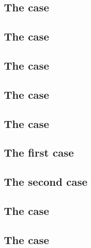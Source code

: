 \subsection{The  case} \label{bls: pointevaluation}    
\subsection{The  case}             \label{bls: g1add}               
\subsection{The  case}             \label{bls: g1msm}               
\subsection{The  case}             \label{bls: g2add}               
\subsection{The  case}             \label{bls: g2msm}               
\subsection{The  first case}    \label{bls: pairingcheck first}        
\subsection{The  second case}    \label{bls: pairingcheck second}        
\subsection{The  case}   \label{bls: fptog1}              
\subsection{The  case}  \label{bls: fp2tog2}             
